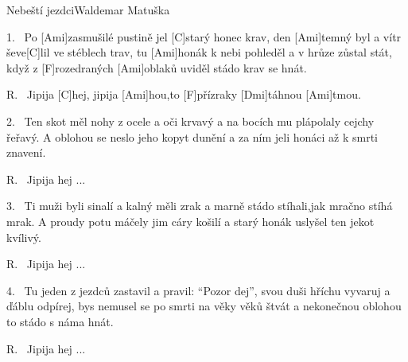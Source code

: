 \begin{song}{Nebeští jezdci}{Waldemar Matuška}

\begin{xverse}{1.~}
Po [\large Ami]zasmušilé pustině jel [\large C]starý honec krav,
den [\large Ami]temný byl a vítr ševe[\large C]lil ve stéblech trav,
tu [\large Ami]honák k nebi pohleděl a v hrůze zůstal stát,
když z [\large F]rozedraných [\large Ami]oblaků uviděl stádo krav se hnát.
\end{xverse}

\begin{xverse}{R.~}
Jipija [\large C]hej, jipija [\large Ami]hou,to [\large F]přízraky [\large Dmi]táhnou [\large Ami]tmou.
\end{xverse}

\begin{xverse}{2.~}
Ten skot měl nohy z ocele a oči krvavý
a na bocích mu plápolaly cejchy řeřavý.
A oblohou se neslo jeho kopyt dunění
a za ním jeli honáci až k smrti znavení.
\end{xverse}

\begin{xverse}{R.~}
Jipija hej ...
\end{xverse}


\begin{xverse}{3.~}
Ti muži byli sinalí a kalný měli zrak
a marně stádo stíhali,jak mračno stíhá mrak.
A proudy potu máčely jim cáry košilí
a starý honák uslyšel ten jekot kvílivý.
\end{xverse}

\begin{xverse}{R.~}
Jipija hej ...
\end{xverse}

\begin{xverse}{4.~}
Tu jeden z jezdců zastavil a pravil: ``Pozor dej'',
svou duši hříchu vyvaruj a ďáblu odpírej,
bys nemusel se po smrti na věky věků štvát
a nekonečnou oblohou to stádo s náma hnát.
\end{xverse}

\begin{xverse}{R.~}
Jipija hej ...
\end{xverse}

\end{song}

